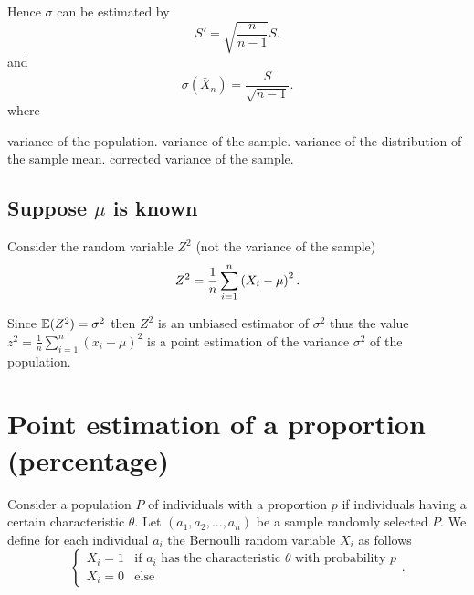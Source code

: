 \documentclass{report}
\begin{document}
Hence $\sigma$ can be estimated by
\[
	S' = \sqrt{\frac{n}{n-1}}S
	.\]
and
\[
	\sigma(\bar{X}_n) = \frac{S}{\sqrt{n-1}}
	.\]
where
\begin{description}
	\ii[$\sigma^2$] variance of the population.
	\ii[$S^2$] variance of the sample.
	 variance of the distribution of the sample mean.
	\ii[$S'^2$] corrected variance of the sample.
\end{description}
\subsection{Suppose $\mu$ is known}
Consider the random variable $Z^2$ (not the variance of the sample)
\[
	Z^2=\frac{1}{n}\sum_{i=1}^n\left(X_i-\mu\right)^2
	.\]

Since $\mathbb{E}(Z^2)=\sigma^2$ then $Z^2$ is an unbiased estimator of $\sigma^2$ thus the value $z^2 = \frac{1}{n}\sum_{i=1}^n(x_i-\mu)^2$ is a point estimation of the variance $\sigma^2$ of the population.


\section{Point estimation of a proportion (percentage)}

Consider a population $P$ of individuals with a proportion $p$ if individuals having a certain characteristic $\theta$. Let $(a_1,a_2,\dots,a_n)$ be a sample randomly selected $P$. We define for each individual $a_i$ the Bernoulli random variable $X_i$ as follows
\[
	\begin{cases}
		X_i=1 & \text{if } a_i \text{ has the characteristic }\theta \text{ with probability }p \\
		X_i=0 & \text{else}
	\end{cases}
	.\]
\end{document}
